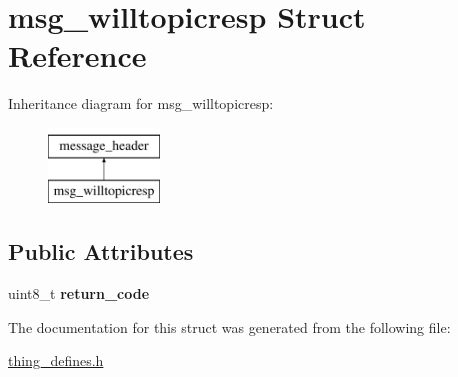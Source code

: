 \hypertarget{structmsg__willtopicresp}{\section{msg\-\_\-willtopicresp Struct Reference}
\label{structmsg__willtopicresp}
}
Inheritance diagram for msg\-\_\-willtopicresp\-:\begin{figure}[H]
\begin{center}
\leavevmode
\includegraphics[height=2.000000cm]{structmsg__willtopicresp}
\end{center}
\end{figure}
\subsection*{Public Attributes}
\begin{DoxyCompactItemize}
\item 
\hypertarget{structmsg__willtopicresp_a0c5dc5afe02d246a3c657d258a47ead9}{uint8\-\_\-t {\bfseries return\-\_\-code}}\label{structmsg__willtopicresp_a0c5dc5afe02d246a3c657d258a47ead9}

\end{DoxyCompactItemize}


The documentation for this struct was generated from the following file\-:\begin{DoxyCompactItemize}
\item 
\hyperlink{thing__defines_8h}{thing\-\_\-defines.\-h}\end{DoxyCompactItemize}
